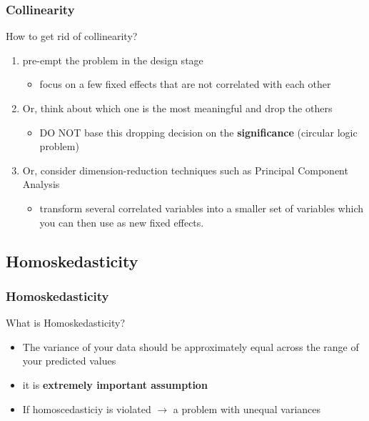 \documentclass[10p]{beamer}\usepackage[]{graphicx}\usepackage[]{color}
\begin{document}
\begin{frame}
\frametitle{Collinearity}
How to get rid of collinearity?
\begin{enumerate}
\item pre-empt the problem in the design stage
	\begin{itemize}
	\item focus on a few fixed effects that are not correlated with each other
	\end{itemize}
\item Or, think about which one is the most meaningful and drop the others
	\begin{itemize}
	\item DO NOT base this dropping decision on the \textbf{significance} (circular logic problem)
	\end{itemize}
\item Or, consider dimension-reduction techniques such as Principal Component Analysis
	\begin{itemize}
	\item transform several correlated variables into a smaller set of variables which you can then use as new fixed effects.
	\end{itemize}
\end{enumerate}
\end{frame}

\subsection{Homoskedasticity}
\begin{frame}
\frametitle{Homoskedasticity}
What is Homoskedasticity?
\begin{itemize}
\item The variance of your data should be approximately equal across the range of your predicted values
\item it is \textbf{extremely important assumption}
\item If homoscedasticiy is violated $\rightarrow$ a problem with unequal variances
\end{itemize}
\end{frame}
\end{document}
